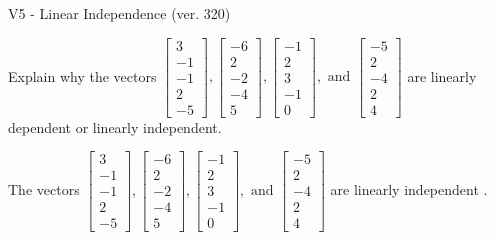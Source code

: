 \begin{exercise}
  \begin{exerciseTitle}V5 - Linear Independence (ver. 320)\end{exerciseTitle}
  \begin{exerciseStatement}
    Explain why the vectors \(\left[\begin{array}{r}
3 \\
-1 \\
-1 \\
2 \\
-5
\end{array}\right] , \left[\begin{array}{r}
-6 \\
2 \\
-2 \\
-4 \\
5
\end{array}\right] , \left[\begin{array}{r}
-1 \\
2 \\
3 \\
-1 \\
0
\end{array}\right] , \text{ and } \left[\begin{array}{r}
-5 \\
2 \\
-4 \\
2 \\
4
\end{array}\right]\) are linearly dependent or linearly independent.	


  \end{exerciseStatement}
  \begin{exerciseAnswer}
   The vectors \(\left[\begin{array}{r}
3 \\
-1 \\
-1 \\
2 \\
-5
\end{array}\right] , \left[\begin{array}{r}
-6 \\
2 \\
-2 \\
-4 \\
5
\end{array}\right] , \left[\begin{array}{r}
-1 \\
2 \\
3 \\
-1 \\
0
\end{array}\right] , \text{ and } \left[\begin{array}{r}
-5 \\
2 \\
-4 \\
2 \\
4
\end{array}\right]\) are 
  	 linearly independent  .
  


  \end{exerciseAnswer}
\end{exercise}